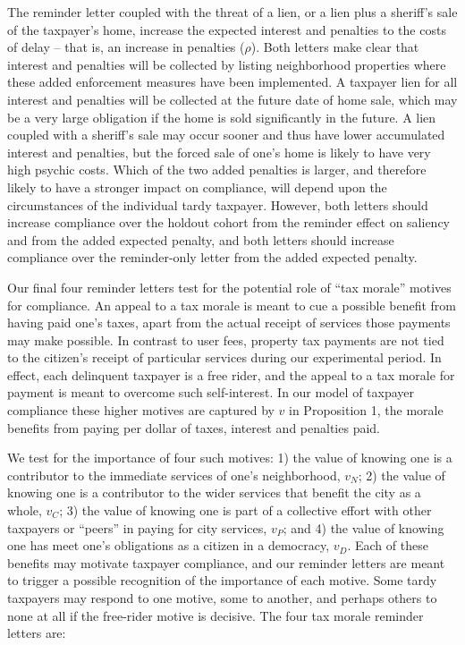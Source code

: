 \bigskip

The reminder letter coupled with the threat of a lien, or a lien plus
a sheriff's sale of the taxpayer's home, increase the expected
interest and penalties to the costs of delay -- that is, an increase
in penalties ($\rho$).  Both letters make clear that interest and
penalties will be collected by listing neighborhood properties where
these added enforcement measures have been implemented.  A taxpayer
lien for all interest and penalties will be collected at the future
date of home sale, which may be a very large obligation if the home is
sold significantly in the future.  A lien coupled with a sheriff's
sale may occur sooner and thus have lower accumulated interest and
penalties, but the forced sale of one's home is likely to have very
high psychic costs.  Which of the two added penalties is larger, and
therefore likely to have a stronger impact on compliance, will depend
upon the circumstances of the individual tardy taxpayer.
However, both letters should increase compliance over the holdout
cohort from the reminder effect on saliency and from the added
expected penalty, and both letters should increase compliance over the
reminder-only letter from the added expected penalty.

Our final four reminder letters test for the potential role of ``tax
morale'' motives for compliance.  An appeal to a tax morale is meant
to cue a possible benefit from having paid one's taxes, apart from the
actual receipt of services those payments may make possible.  In
contrast to user fees, property tax payments are not tied to the
citizen's receipt of particular services during our experimental
period.  In effect, each delinquent taxpayer is a free rider, and the
appeal to a tax morale for payment is meant to overcome such
self-interest.  In our model of taxpayer compliance these higher
motives are captured by $v$ in Proposition 1, the morale benefits
from paying per dollar of taxes, interest and penalties paid.

We test for the importance of four such motives: 1) the value of
knowing one is a contributor to the immediate services of one's
neighborhood, $v_{N}$; 2) the value of knowing one is a contributor to
the wider services that benefit the city as a whole, $v_{C}$; 3) the
value of knowing one is part of a collective effort with other
taxpayers or ``peers'' in paying for city services, $v_{P}$; and 4)
the value of knowing one has meet one's obligations as a citizen in a
democracy, $v_{D}$.  Each of these benefits may motivate taxpayer
compliance, and our reminder letters are meant to trigger a possible
recognition of the importance of each motive.  Some tardy
taxpayers may respond to one motive, some to another, and perhaps
others to none at all if the free-rider motive is decisive.  The four
tax morale reminder letters are:

